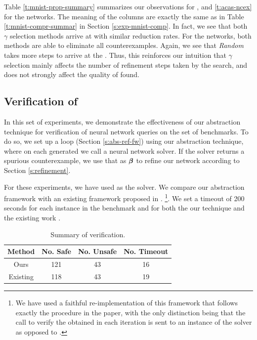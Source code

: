 Table \ref{t:mnist-prop-summary} summarizes our observations for \mnist, and
\ref{t:acas-ncex} for the \acasxu networks. The meaning of the columns are
exactly the same as in Table \ref{t:mnist-compr-summar} in Section
\ref{s:exp-mnist-comp}. In fact, we see that both $\gamma$ selection methods
arrive at \abs with similar reduction rates. For the \mnist networks, both
methods are able to eliminate all counterexamples.  Again, we see that
\textit{Random} takes more steps to arrive at the \abs. Thus, this reinforces
our intuition that $\gamma$ selection mainly affects the number of refinement
steps taken by the search, and does not strongly affect the quality of \abs
found.

\subsection{Verification of \acasxu}
\label{s:acas-verif}

In this set of experiments, we demonstrate the effectiveness of our abstraction
technique for verification of neural network queries on the \acasxu set of
benchmarks. To do so, we set up a \cegar loop (Section \ref{s:abs-ref-fw}) using
our abstraction technique, where on each \abs generated we call a neural network
solver. If the solver returns a spurious counterexample, we use
that as $\boldsymbol{\beta}$ to refine our network according to Section
\ref{s:refinement}.  

For these experiments, we have used \neuralsat as the solver. 
We compare our abstraction framework with an existing \cegar framework proposed
in \cite{cegar-nn}. 
\footnote{We have used a faithful re-implementation of this framework that
follows exactly the procedure in the paper, with the only distinction being that
the call to verify the \abs obtained in each iteration is sent to an instance of
the \neuralsat solver as opposed to \marabou. }. We set a
timeout of 200 seconds for each instance in the benchmark and for both the
our technique and the existing work \cite{cegar-nn}.

\begin{table}
\begin{tabular}{ |c|c|c|c| }
\hline
Method                   & No. Safe & No. Unsafe & No. Timeout \\ 
\hline
Ours                     &   121       & 43       & 16    \\
Existing \cite{cegar-nn} &   118       & 43       & 19    \\
\hline                                                                
\end{tabular}
\caption{Summary of \acasxu verification. }
\label{t:acas-verif}
\end{table}

